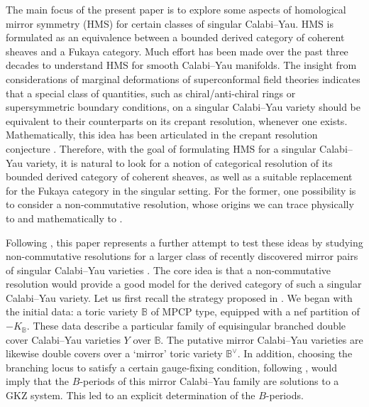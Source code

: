 \documentclass[12pt,a4paper,oneside]{amsart}
\numberwithin{equation}{section}
\theoremstyle{definition}
\theoremstyle{remark}
\newcommand{\cB}{\mathbb{B}}
\begin{document}
The main focus of the present paper is to explore some aspects of homological mirror symmetry (HMS) \cite{Kontsevich:1994dn} for certain classes of singular Calabi--Yau. HMS is formulated as an equivalence between a bounded derived category of coherent sheaves and a Fukaya category. Much effort has been made over the past three decades to understand HMS for smooth Calabi--Yau manifolds. The insight from considerations of marginal deformations of superconformal field theories \cite{Lerche:1989uy,Cecotti:1991me} indicates that a special class of quantities, such as chiral/anti-chiral rings or supersymmetric boundary conditions, on a singular Calabi--Yau variety should be equivalent to their counterparts on its crepant resolution, whenever one exists. Mathematically, this idea has been articulated in the crepant resolution conjecture \cite{Ruan:2001xm}. 
Therefore, with the goal of formulating HMS for a singular Calabi--Yau variety, it is natural to look for a notion of categorical resolution of its bounded derived category of coherent sheaves, as well as a suitable replacement for the Fukaya category in the singular setting. For the former, one possibility is to consider a non-commutative resolution, whose origins we can trace physically to \cite{Caldararu:2010ljp} and mathematically to \cite{VandenBergh:2002,Kuznetsov:06}.\par


Following \cite{Lee:2023piu}, this paper represents a further attempt to test these ideas by studying non-commutative resolutions for a larger class of
recently discovered mirror pairs of singular Calabi--Yau varieties \cite{Hosono:2020gpj}. The core idea is that a non-commutative resolution would provide a good model for the derived category of such a singular Calabi--Yau variety. Let us first recall the strategy proposed in \cite{Lee:2023piu}. We began with the initial data: a toric variety $\cB$ of MPCP type, equipped with a nef partition of $-K_{\cB}$. These data describe a particular family of equisingular branched double cover Calabi--Yau varieties $Y$ over $\cB$. The putative mirror Calabi--Yau varieties are likewise double covers over a `mirror' toric variety $\cB^\vee$. In addition, choosing the branching locus to satisfy a certain gauge-fixing condition, following \cite{Hosono:2018kqt,Hosono:2019jet}, would imply that the $B$-periods of this mirror Calabi--Yau family are solutions to a GKZ system. This led to an explicit determination of the $B$-periods. 
\end{document}
